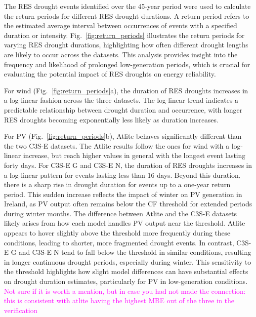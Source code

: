 \documentclass[a4paper, 11pt]{article}
\begin{document}
The RES drought events identified over the 45-year period were used to calculate the return periods for different RES drought durations. A return period refers to the estimated average interval between occurrences of events with a specified duration or intensity. Fig.~\ref{fig:return_periods} illustrates the return periods for varying RES drought durations, highlighting how often different drought lengths are likely to occur across the datasets. This analysis provides insight into the frequency and likelihood of prolonged low-generation periods, which is crucial for evaluating the potential impact of RES droughts on energy reliability.

For wind (Fig.~\ref{fig:return_periods}a), the duration of RES droughts increases in a log-linear fashion across the three datasets. The log-linear trend indicates a predictable relationship between drought duration and occurrence, with longer RES droughts becoming exponentially less likely as duration increases. 

For PV (Fig.~\ref{fig:return_periods}b), Atlite behaves significantly different than the two C3S-E datasets. The Atlite results follow the ones for wind with a log-linear increase, but reach higher values in general with the longest event lasting forty days. For C3S-E G and C3S-E N, the duration of RES droughts increases in a log-linear pattern for events lasting less than 16 days. Beyond this duration, there is a sharp rise in drought duration for events up to a one-year return period. This sudden increase reflects the impact of winter on PV generation in Ireland, as PV output often remains below the CF threshold for extended periods during winter months. The difference between Atlite and the C3S-E datasets likely arises from how each model handles PV output near the threshold. Atlite appears to hover slightly above the threshold more frequently during these conditions, leading to shorter, more fragmented drought events. In contrast, C3S-E G and C3S-E N tend to fall below the threshold in similar conditions, resulting in longer continuous drought periods, especially during winter. This sensitivity to the threshold highlights how slight model differences can have substantial effects on drought duration estimates, particularly for PV in low-generation conditions. \textcolor{magenta}{Not sure if it is worth a mention, but in case you had not made the connection: this is consistent with atlite having the highest MBE out of the three in the verification}
\end{document}
